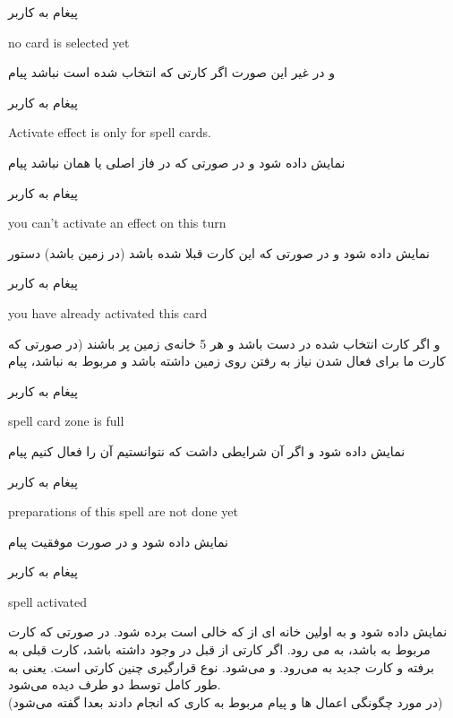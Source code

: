 \documentclass[]{article}
\begin{document}
\begin{mybox}[colback=yellow]{پیغام به کاربر}
	\begin{latin}	
		no card is selected yet
	\end{latin}
\end{mybox}
و در غیر این صورت اگر کارتی که انتخاب شده است  نباشد پیام
\begin{mybox}[colback=yellow]{پیغام به کاربر}
	\begin{latin}	
		Activate effect is only for spell cards.	
	\end{latin}
\end{mybox}
نمایش داده شود و در صورتی که در فاز اصلی یا همان  نباشد پیام
\begin{mybox}[colback=yellow]{پیغام به کاربر}
	\begin{latin}	
		you can’t activate an effect on this turn
	\end{latin}
\end{mybox}
نمایش داده شود و در صورتی که این کارت قبلا  شده باشد (در زمین 
باشد) دستور 
\begin{mybox}[colback=yellow]{پیغام به کاربر}
\begin{latin}	
	you have already activated this card
\end{latin}
\end{mybox}
و اگر کارت انتخاب شده در دست باشد و هر 5 خانه‌ی  زمین پر باشند (در 
صورتی که کارت ما برای فعال شدن نیاز به رفتن روی زمین داشته باشد و مربوط به 
 نباشد، پیام
\begin{mybox}[colback=yellow]{پیغام به کاربر}
\begin{latin}	
	spell card zone is full
\end{latin}
\end{mybox}
نمایش داده شود و اگر آن  شرایطی داشت که نتوانستیم آن را فعال کنیم 
پیام
\begin{mybox}[colback=yellow]{پیغام به کاربر}
	\begin{latin}	
		preparations of this spell are not done yet
	\end{latin}
\end{mybox}
نمایش داده شود و در صورت موفقیت پیام
\begin{mybox}[colback=yellow]{پیغام به کاربر}
	\begin{latin}	
		spell activated
	\end{latin}
\end{mybox}
نمایش داده شود و به اولین خانه ای از  که خالی است برده 
شود. در صورتی که کارت مربوط به  باشد، به  می 
رود. اگر کارتی از قبل در  وجود داشته باشد، کارت قبلی به 
 برفته و کارت جدید به  می‌رود. و  
می‌شود. نوع قرارگیری چنین کارتی  است. یعنی به طور کامل توسط دو طرف دیده 
می‌شود.
\\
(در مورد چگونگی اعمال  ها و پیام مربوط به کاری که انجام دادند بعدا 
گفته می‌شود)
\end{document}
